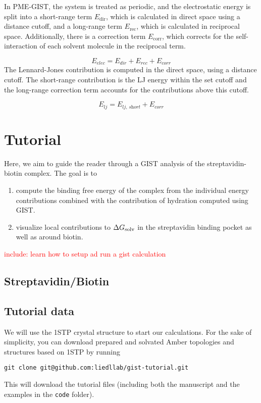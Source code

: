 \documentclass[9pt,tutorial]{livecoms}
\newcommand{\dgsolv}{\Delta G_\textup{solv}}
\newcommand{\software}{\texttt}
\newcommand{\todo}{\textcolor{red}}
\begin{document}
In PME-GIST, the system is treated as periodic, and the electrostatic energy is split into a short-range term $E_\text{dir}$, which is calculated in direct space using a distance cutoff, and a long-range term $E_\text{rec}$, which is calculated in reciprocal space.
Additionally, there is a correction term $E_\text{corr}$, which corrects for the self-interaction of each solvent molecule in the reciprocal term.

\begin{equation}
	E_\textit{elec} = E_\textit{dir} + E_\textit{rec} + E_\textit{corr}
\end{equation}
The Lennard-Jones contribution is computed in the direct space, using a distance cutoff. The short-range contribution is the LJ energy within the set cutoff and the long-range correction term accounts for the contributions above this cutoff.

\begin{equation}
	E_\textit{lj} = E_\textit{lj,\ short} +  E_\textit{corr}
\end{equation}

\section{Tutorial}
Here, we aim to guide the reader through a GIST analysis of the streptavidin-biotin complex. The goal is to
\begin{enumerate}
	\item compute the binding free energy of the complex from the individual energy contributions combined with the contribution of hydration computed using GIST.
	\item visualize local contributions to $\dgsolv$ in the streptavidin binding pocket as well as around biotin.
\end{enumerate}
\todo{include: learn how to setup ad run a gist calculation}

\subsection{Streptavidin/Biotin}
\subsection{Tutorial data}
We will use the 1STP crystal structure to start our calculations.
For the sake of simplicity, you can download prepared and solvated Amber topologies and structures based on 1STP by running
\begin{lstlisting}
git clone git@github.com:liedllab/gist-tutorial.git
\end{lstlisting}
This will download the tutorial files (including both the manuscript and the examples in the \software{code} folder).
\end{document}
